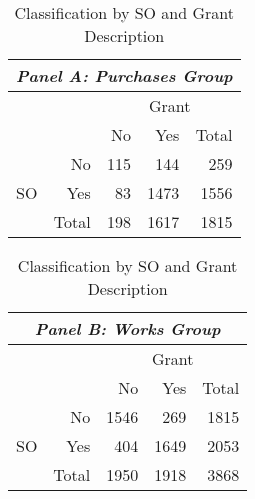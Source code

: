 \begin{table}[!htbp]
  \caption{\label{tab:textualdescription}Classification by SO and Grant Description}
  \centering
  \scriptsize
  \begin{tabular}{cr|rrr}
    \hline

    \hline
    \multicolumn{5}{c}{\emph{Panel A: Purchases Group}} \T \B \\
    \hline
    & & \multicolumn{3}{c}{Grant} \T \B \\
    & & No  & Yes  & Total \T \B \\
    \hline
    \multirow[c]{4}{*}{\begin{sideways}SO\end{sideways}} & No    & 115 & 144  & 259  \T \B \\
    & Yes   & 83  & 1473 & 1556 \T \B \\
    & Total & 198 & 1617 & 1815 \T \B \\
    \hline

    \hline
  \end{tabular} \hspace{6pt} \begin{tabular}{cr|rrr}
    \hline

    \hline
    \multicolumn{5}{c}{\emph{Panel B: Works Group}} \T \B \\
    \hline
    & & \multicolumn{3}{c}{Grant} \T \B \\
    & & No  & Yes  & Total \T \B \\
    \hline
    \multirow[c]{4}{*}{\begin{sideways}SO\end{sideways}} & No        & 1546      & 269       & 1815 \T \B \\
    & Yes       & 404       & 1649      & 2053 \T \B \\
    & Total     & 1950      & 1918      & 3868 \T \B \\
    \hline

    \hline
  \end{tabular}
\end{table}